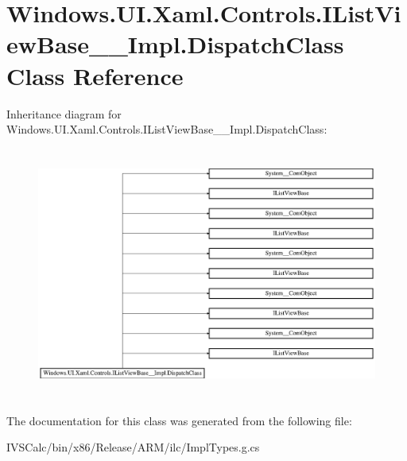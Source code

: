 \hypertarget{class_windows_1_1_u_i_1_1_xaml_1_1_controls_1_1_i_list_view_base_____impl_1_1_dispatch_class}{}\section{Windows.\+U\+I.\+Xaml.\+Controls.\+I\+List\+View\+Base\+\_\+\+\_\+\+Impl.\+Dispatch\+Class Class Reference}
\label{class_windows_1_1_u_i_1_1_xaml_1_1_controls_1_1_i_list_view_base_____impl_1_1_dispatch_class}
Inheritance diagram for Windows.\+U\+I.\+Xaml.\+Controls.\+I\+List\+View\+Base\+\_\+\+\_\+\+Impl.\+Dispatch\+Class\+:\begin{figure}[H]
\begin{center}
\leavevmode
\includegraphics[height=8.324325cm]{class_windows_1_1_u_i_1_1_xaml_1_1_controls_1_1_i_list_view_base_____impl_1_1_dispatch_class}
\end{center}
\end{figure}


The documentation for this class was generated from the following file\+:\begin{DoxyCompactItemize}
\item 
I\+V\+S\+Calc/bin/x86/\+Release/\+A\+R\+M/ilc/Impl\+Types.\+g.\+cs\end{DoxyCompactItemize}
